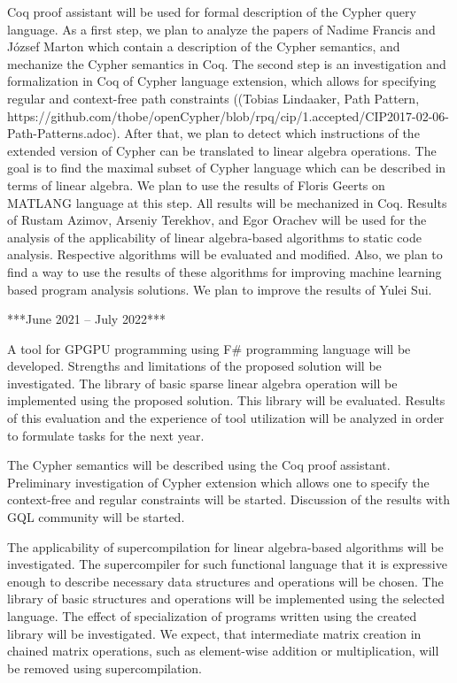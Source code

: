 \documentclass[12pt]{article}  %
\theoremstyle{remark}
\begin{document}
Coq proof assistant will be used for formal description of the Cypher query language. As a first step, we plan to analyze the papers of Nadime Francis and József Marton which contain a description of the Cypher semantics, and mechanize the Cypher semantics in Coq. The second step is an investigation and formalization in Coq of Cypher language extension, which allows for specifying regular and context-free path constraints ((Tobias Lindaaker, Path Pattern, https://github.com/thobe/openCypher/blob/rpq/cip/1.accepted/CIP2017-02-06-Path-Patterns.adoc). After that, we plan to detect which instructions of the extended version of Cypher can be translated to linear algebra operations. The goal is to find the maximal subset of Cypher language which can be described in terms of linear algebra. We plan to use the results of Floris Geerts on MATLANG language at this step. All results will be mechanized in Coq. 
Results of Rustam Azimov, Arseniy Terekhov, and Egor Orachev will be used for the analysis of the applicability of linear algebra-based algorithms to static code analysis. Respective algorithms will be evaluated and modified. Also, we plan to find a way to use the results of these algorithms for improving machine learning based program analysis solutions. We plan to improve the results of Yulei Sui.  

***June 2021 -- July 2022***

A tool for GPGPU programming using F# programming language will be developed. Strengths and limitations of the proposed solution will be investigated. The library of basic sparse linear algebra operation will be implemented using the proposed solution. This library will be evaluated. Results of this evaluation and the experience of tool utilization will be analyzed in order to formulate tasks for the next year.  

The Cypher semantics will be described using the Coq proof assistant. Preliminary investigation of Cypher extension which allows one to specify the context-free and regular constraints will be started. Discussion of the results with GQL community will be started.

The applicability of supercompilation for linear algebra-based algorithms will be investigated. The supercompiler for such functional language that it is expressive enough to describe necessary data structures and operations will be chosen. The library of basic structures and operations will be implemented using the selected language. The effect of specialization of programs written using the created library will be investigated. We expect, that intermediate matrix creation in chained matrix operations, such as element-wise addition or multiplication, will be removed using supercompilation.
\end{document}
